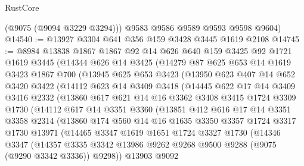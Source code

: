 \begin{lexlean}{RustCore}
\begin{coremodule}
        (@9075 (@9094 @3229 @3294)))
      @9583
      @9586
      @9589
      @9593
      @9598
      @9604)
@14540 := @13927 @3304 @641 @356 @159 @3428 @3445 @1619 @2108
@14745 := @8984
    @13838
    @1867
    @1867
    @92
    @14
    @626
    @640
    @159
    @3425
    @92
    @1721
    @1619
    @3445
    (@14344
      @626
      @14
      @3425
      (@14279
        @87
        @625
        @653
        @14
        @1619
        @3423
        @1867
        @700
        (@13945
          @625
          @653
          @3423
          (@13950
            @623
            @407
            @14
            @652
            @3420
            @3422
            (@14112
              @623
              @14
              @3409
              @3418
              (@14445
                @622
                @17
                @14
                @3409
                @3416
                @2332
                (@13860
                  @617
                  @621
                  @14
                  @16
                  @3362
                  @3408
                  @3415
                  @1724
                  @3309
                  @1730
                  (@14112
                    @617
                    @14
                    @3351
                    @3360
                    (@13851
                      @412
                      @616
                      @17
                      @14
                      @3351
                      @3358
                      @2314
                      (@13860
                        @174
                        @560
                        @14
                        @16
                        @1635
                        @3350
                        @3357
                        @1724
                        @3317
                        @1730
                        @13971
                        (@14465
                          @3347
                          @1619
                          @1651
                          @1724
                          @3327
                          @1730
                          (@14346
                            @3347
                            (@14357
                              @3335
                              @3342
                              @13986
                              @9262
                              @9268
                              @9500
                              @9288
                              (@9075 (@9290 @3342 @3336))
                              @9298))
                          @13903
                          @9092

\end{coremodule}
\end{lexlean}
